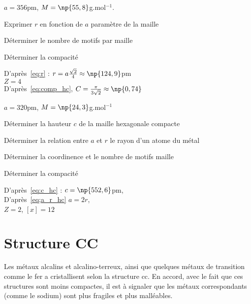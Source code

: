 \begin{ex}
    $a = 356$pm,
    $M = \np{55,8}$g.mol$^{-1}$.
    \begin{compactitem}
        \item Exprimer $r$ en fonction de $a$ paramètre
            de la maille
        \item Déterminer le nombre de motifs par maille
        \item Déterminer la compacité
    \end{compactitem}
    D'après~\ref{eq:r} : $r = a\frac{\sqrt{2}}{4} \approx \np{124,9}$pm\\
    $Z = 4$\\
    D'après~\ref{eq:comp_hc}, $C = \frac{\pi}{3\sqrt{2}} \approx \np{0,74}$
\end{ex}
\begin{ex}
    $a = 320$pm,
    $M = \np{24,3}$g.mol$^{-1}$
    \begin{compactitem}
        \item Déterminer la hauteur $c$ de la maille hexagonale
            compacte
        \item Déterminer la relation entre $a$ et $r$ le rayon
            d'un atome du métal
        \item Déterminer la coordinence et le nombre de motifs
            maille
        \item Déterminer la compacité
    \end{compactitem}
    D'après~\ref{eq:c_hc} : $c = \np{552,6}$pm,\\
    D'après~\ref{eq;a_r_hc} $a = 2r$,\\
    $Z = 2$, $[x] = 12$
\end{ex}


\section{Structure CC}
Les métaux alcalins et alcalino-terreux, ainsi que quelques 
métaux de transition comme le fer a cristallisent selon la structure cc.
En accord, avec le fait que ces structures sont moins compactes,
il est à signaler que les métaux correspondants (comme le sodium) sont
plus fragiles et plus malléables.

